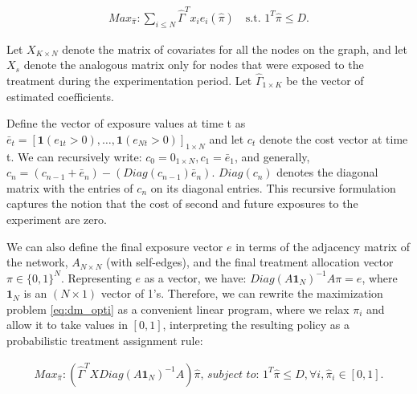 \documentclass[11pt,a4paper]{article}
\begin{document}
\begin{align}\label{eq:dm_opti}
Max_{\hat \pi} : \sum_{i \leq N} \hat \Gamma^T x_i e_i(\hat \pi)  \quad \mbox{s.t. } 1^T \hat \pi \leq D .
\end{align}

Let $X_{K \times N}$ denote the matrix of covariates for all the nodes on the graph, and let $X_s$ denote the analogous matrix only for nodes that were exposed to the treatment during the experimentation period. Let $\hat \Gamma _{1 \times K}$ be the vector of estimated coefficients.

Define the vector of exposure values at time t as $\bar e_t=[\mathbf{1}(e_{1t}>0), \dots, \mathbf{1}(e_{Nt}>0)]_{1 \times N}$ and let $c_t$ denote the cost vector at time t.  We can recursively write: $c_0 = 0_{1 \times N}, c_1 = \bar e_1$, and generally, $c_n = (c_{n-1} + \bar e_n) - (Diag(c_{n-1})  \bar e_n) $. $Diag(c_n)$ denotes the diagonal matrix with the entries of $c_n$ on its diagonal entries. This recursive formulation captures the notion that the cost of second and future exposures to the experiment are zero.

We can also define the final exposure vector $e$ in terms of the adjacency matrix of the network, $A_{N \times N}$ (with self-edges), and the final treatment allocation vector $\pi \in \{0,1\}^N$. Representing $e$ as a vector, we have: $Diag(A \mathbf{1}_{N} ) ^{-1} A\pi  = e$, where $\mathbf{1}_{N}$ is an $(N \times 1)$ vector of 1's. Therefore, we can rewrite the maximization problem \eqref{eq:dm_opti} as a convenient linear program, where we relax $\pi_i$ and allow it to take values in $[0,1]$, interpreting the resulting policy as a probabilistic treatment assignment rule:

\begin{align}\label{eq:dm_opti_lin}
Max_{\hat \pi}: \left(\hat \Gamma^T X Diag(A \mathbf{1}_{N} ) ^{-1} A \right) \hat \pi  \textit{, subject to: } 1^T \hat \pi \leq D , \forall i, \hat \pi_i \in [0,1].
\end{align}
\end{document}
